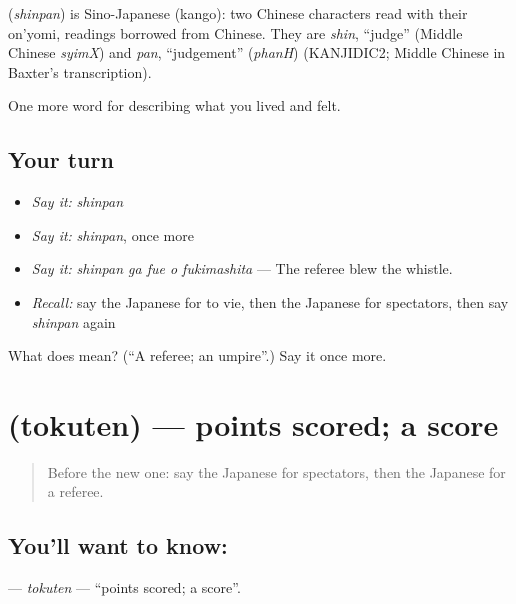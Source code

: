 \begin{cousinweb}
\textbf{} (\emph{shinpan}) is Sino-Japanese (kango): two Chinese characters read with their on'yomi, readings borrowed from Chinese. They are \emph{shin}, \textquotedblleft{}judge\textquotedblright{} (Middle Chinese \emph{syimX}) and \emph{pan}, \textquotedblleft{}judgement\textquotedblright{} (\emph{phanH}) (KANJIDIC2; Middle Chinese in Baxter's transcription).
\end{cousinweb}

\begin{grammarlens}[title={What you've built}]
One more word for describing what you lived and felt.
\end{grammarlens}

\subsection*{Your turn}
\begin{itemize}
\raggedright
  \item \emph{Say it:} \emph{shinpan}
  \item \emph{Say it:} \emph{shinpan}, once more
  \item \emph{Say it:} \emph{shinpan ga fue o fukimashita} — The referee blew the whistle.
  \item \emph{Recall:} say the Japanese for to vie, then the Japanese for spectators, then say \emph{shinpan} again
\end{itemize}

\begin{tcolorbox}[breakable,colback=teal!4,colframe=teal!35!black,title={Before you move on}]
What does  mean? (\textquotedblleft{}A referee; an umpire\textquotedblright{}.) Say it once more.
\end{tcolorbox}
\section[\texorpdfstring{\ja{とくてん} (tokuten)}{とくてん (tokuten)}]{ (tokuten) — points scored; a score}

\label{lesson:JA-C464-tokuten}



\begin{quote}
Before the new one: say the Japanese for spectators, then the Japanese for a referee.
\end{quote}

\subsection*{You'll want to know: }
\textbf{} — \emph{tokuten} — \textquotedblleft{}points scored; a score\textquotedblright{}.

